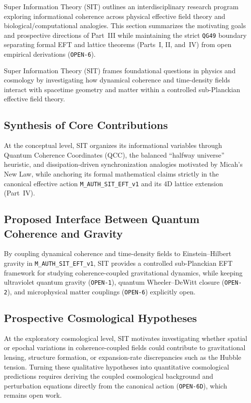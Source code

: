 Super Information Theory (SIT) outlines an interdisciplinary research program exploring informational coherence across physical effective field theory and biological/computational analogies. This section summarizes the motivating goals and prospective directions of Part~III while maintaining the strict \texttt{QG49} boundary separating formal EFT and lattice theorems (Parts~I, II, and~IV) from open empirical derivations (\texttt{OPEN-6}).

Super Information Theory (SIT) frames foundational questions in physics and cosmology by investigating how dynamical coherence and time-density fields interact with spacetime geometry and matter within a controlled sub-Planckian effective field theory.

\subsection{Synthesis of Core Contributions}

At the conceptual level, SIT organizes its informational variables through Quantum Coherence Coordinates (QCC), the balanced ``halfway universe'' heuristic, and dissipation-driven synchronization analogies motivated by Micah's New Law, while anchoring its formal mathematical claims strictly in the canonical effective action \texttt{M\_AUTH\_SIT\_EFT\_v1} and its 4D lattice extension (Part~IV).

\subsection{Proposed Interface Between Quantum Coherence and Gravity}

By coupling dynamical coherence and time-density fields to Einstein--Hilbert gravity in \texttt{M\_AUTH\_SIT\_EFT\_v1}, SIT provides a controlled sub-Planckian EFT framework for studying coherence-coupled gravitational dynamics, while keeping ultraviolet quantum gravity (\texttt{OPEN-1}), quantum Wheeler--DeWitt closure (\texttt{OPEN-2}), and microphysical matter couplings (\texttt{OPEN-6}) explicitly open.

\subsection{Prospective Cosmological Hypotheses}

At the exploratory cosmological level, SIT motivates investigating whether spatial or epochal variations in coherence-coupled fields could contribute to gravitational lensing, structure formation, or expansion-rate discrepancies such as the Hubble tension. Turning these qualitative hypotheses into quantitative cosmological predictions requires deriving the coupled cosmological background and perturbation equations directly from the canonical action (\texttt{OPEN-6D}), which remains open work.

